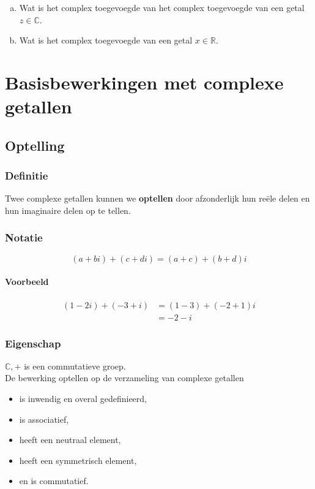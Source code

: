 \documentclass[12pt,twoside,a4paper]{article}
\begin{document}
\begin{oefening}
\begin{enumerate}[(a)]
  \item Wat is het complex toegevoegde van het complex toegevoegde van een getal $z\in\mathbb{C}$.
  \item Wat is het complex toegevoegde van een getal $x\in\mathbb{R}$.
\end{enumerate}
\end{oefening}

\pagebreak
\section{Basisbewerkingen met complexe getallen}

\subsection{Optelling}

\subsubsection*{Definitie}
\begin{mdframed}
Twee complexe getallen kunnen we {\bf optellen} door afzonderlijk hun reële delen en hun imaginaire delen op te tellen.
\end{mdframed}

\subsubsection*{Notatie}
$$(a+bi) + (c+di) = (a+c) + (b+d)i$$

\paragraph{Voorbeeld}
\begin{align*}
  (1 - 2i) + (-3 + i) &= (1 - 3) + (-2 + 1)i \\
                      &= -2-i
\end{align*}

\subsubsection*{Eigenschap}
$\mathbb{C},+$ is een commutatieve groep.\\
De bewerking optellen op de verzameling van complexe getallen
\begin{itemize}
  \item is inwendig en overal gedefinieerd,
  \item is associatief,
  \item heeft een neutraal element,
  \item heeft een symmetrisch element,
  \item en is commutatief.
\end{itemize}
\end{document}
